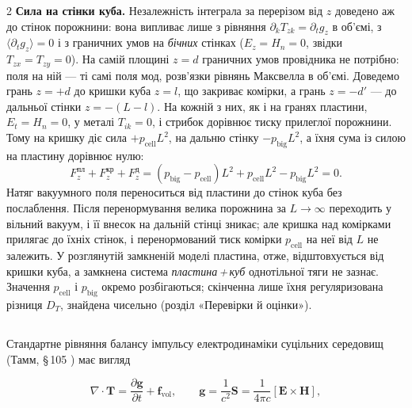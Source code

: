 \documentclass[twoside, 10pt]{article}
\def\myvspacebeforesubsection{-2.0mm}
\def\myvspaceaftersubsection{-2.5mm}
\begin{document}
\begin{multicols}{2}
\textbf{Сила на стінки куба.} Незалежність інтеграла за перерізом від \(z\) доведено аж до стінок порожнини: вона випливає лише з рівняння \(\partial_kT_{zk}=\partial_tg_z\) в об'ємі, з \(\langle\partial_tg_z\rangle=0\) і з граничних умов на \emph{бічних} стінках (\(E_z=H_n=0\), звідки \(T_{zx}=T_{zy}=0\)). На самій площині \(z=d\) граничних умов провідника не потрібно: поля на ній --- ті самі поля мод, розв'язки рівнянь Максвелла в об'ємі. Доведемо грань \(z=+d\) до кришки куба \(z=l\), що закриває комірки, а грань \(z=-d'\) --- до дальньої стінки \(z=-(L-l)\). На кожній з них, як і на гранях пластини, \(E_t=H_n=0\), у металі \(T_{ik}=0\), і стрибок дорівнює тиску прилеглої порожнини. Тому на кришку діє сила \(+p_{\text{cell}}L^2\), на дальню стінку \(-p_{\text{big}}L^2\), а їхня сума із силою на пластину дорівнює нулю:
\[
F_z^{\text{пл}}+F_z^{\text{кр}}+F_z^{\text{д}}=(p_{\text{big}}-p_{\text{cell}})L^2+p_{\text{cell}}L^2-p_{\text{big}}L^2=0 .
\]
Натяг вакуумного поля переноситься від пластини до стінок куба без послаблення. Після перенормування велика порожнина за \(L\to\infty\) переходить у вільний вакуум, і її внесок на дальній стінці зникає; але кришка над комірками прилягає до їхніх стінок, і перенормований тиск комірки \(p_{\text{cell}}\) на неї від \(L\) не залежить. У розглянутій замкненій моделі пластина, отже, відштовхується від кришки куба, а замкнена система \emph{пластина\,+\,куб} однотільної тяги не зазнає. Значення \(p_{\text{cell}}\) і \(p_{\text{big}}\) окремо розбігаються; скінченна лише їхня регуляризована різниця \(D_T\), знайдена чисельно (розділ «Перевірки й оцінки»).

\vspace{\myvspacebeforesubsection}
\subsection*{}
\vspace{\myvspaceaftersubsection}


Стандартне рівняння балансу імпульсу електродинаміки суцільних середовищ (Тамм, \S\,105
\cite{Tamm1957}) має вигляд

\end{multicols}
\[
\nabla\cdot\mathbf{T} = \frac{\partial\mathbf{g}}{\partial t} + \mathbf{f}_{\mathrm{vol}},
\qquad
\mathbf{g} = \frac{1}{c^2}\mathbf{S} = \frac{1}{4\pi c}[\mathbf{E}\times\mathbf{H}],
\]
\end{document}
